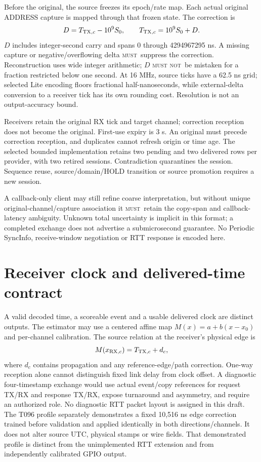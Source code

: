 \documentclass[11pt,letterpaper]{article}
\newcommand{\page}{\clearpage}
\newcommand{\must}{\textsc{must}}
\newcommand{\mustnot}{\textsc{must not}}
\begin{document}
Before the original, the source freezes its epoch/rate map. Each actual original ADDRESS capture is mapped through that frozen state. The correction is
\begin{equation}
D=T_{{\rm TX},c}-10^9 S_0,\qquad T_{{\rm TX},c}=10^9S_0+D.
\end{equation}
$D$ includes integer-second carry and spans 0 through 4294967295 ns. A missing capture or negative/overflowing delta \must\ suppress the correction. Reconstruction uses wide integer arithmetic; $D$ \mustnot\ be mistaken for a fraction restricted below one second. At 16 MHz, source ticks have a 62.5 ns grid; selected Lite encoding floors fractional half-nanoseconds, while external-delta conversion to a receiver tick has its own rounding cost. Resolution is not an output-accuracy bound.

Receivers retain the original RX tick and target channel; correction reception does not become the original. First-use expiry is 3 s. An original must precede correction reception, and duplicates cannot refresh origin or time age. The selected bounded implementation retains two pending and two delivered rows per provider, with two retired sessions. Contradiction quarantines the session. Sequence reuse, source/domain/HOLD transition or source promotion requires a new session.

A callback-only client may still refine coarse interpretation, but without unique original-channel/capture association it \must\ retain the copy-span and callback-latency ambiguity. Unknown total uncertainty is implicit in this format; a completed exchange does not advertise a submicrosecond guarantee. No Periodic SyncInfo, receive-window negotiation or RTT response is encoded here.

\page
\section{Receiver clock and delivered-time contract}\label{sec:clock}
A valid decoded time, a scoreable event and a usable delivered clock are distinct outputs. The estimator may use a centered affine map $M(x)=a+b(x-x_0)$ and per-channel calibration. The source relation at the receiver's physical edge is
\begin{equation}
M(x_{{\rm RX},c})=T_{{\rm TX},c}+d_c,
\end{equation}
where $d_c$ contains propagation and any reference-edge/path correction. One-way reception alone cannot distinguish fixed link delay from clock offset. A diagnostic four-timestamp exchange would use actual event/copy references for request TX/RX and response TX/RX, expose turnaround and asymmetry, and require an authorized role. No diagnostic RTT packet layout is assigned in this draft. The T096 profile separately demonstrates a fixed 10,516 ns edge correction trained before validation and applied identically in both directions/channels. It does not alter source UTC, physical stamps or wire fields. That demonstrated profile is distinct from the unimplemented RTT extension and from independently calibrated GPIO output.
\end{document}
